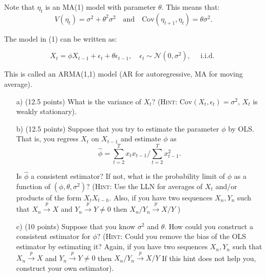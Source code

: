 \documentclass[12] {article}
\begin{document}
\noindent Note that $\eta_t$ is an MA(1) model with parameter $\theta$. This means that:
\[ V(\eta_t) = \sigma^2 + \theta^2 \sigma^2 \quad \textrm{and} \quad \textrm{Cov}(\eta_{t+1}, \eta_t) = \theta \sigma^2.  \]

\noindent The model in (1) can be written as:

\begin{equation}
X_t =  \phi X_{t-1} + \epsilon_t + \theta \epsilon_{t-1}, \quad \epsilon_t \sim \mathcal{N}(0,\sigma^2), \quad \textrm{ i.i.d. }
\end{equation}

\noindent This is called an ARMA(1,1) model (AR for autoregressive, MA for moving average). 

\begin{itemize}

\item [a)] (12.5 points) What is the variance of $X_t$? ({\scshape{Hint}}: $\textrm{Cov}(X_t,\epsilon_t) = \sigma^2$, $X_t$ is weakly stationary).     \\

\item [b)] (12.5 points) Suppose that you try to estimate the parameter $\phi$ by OLS. That is, you regress $X_t$ on $X_{t-1}$ and estimate $\phi$ as
\[ \widehat{\phi} =  \sum_{t=2}^{T} x_t x_{t-1} \Big / \sum_{t=2}^{T} x_{t-1}^2.  \]


Is $\widehat{\phi}$ a consistent estimator? If not, what is the probability limit of $\phi$ as a function of $(\phi, \theta, \sigma^2)$? ({\scshape{Hint:}} Use the LLN for averages of $X_t$ and/or products of the form $X_{t} X_{t-h}$. Also, if you have two sequences $X_n, Y_n$ such that $X_n \overset{p}{\rightarrow} X$ and $Y_n \overset{p}{\rightarrow} Y \neq 0$ then $X_n / Y_n \overset{p}{\rightarrow} X/Y$ )\\

\item [c)] (10 points) Suppose that you know $\sigma^2$ and $\theta$. How could you construct a consistent estimator for $\phi$? ({\scshape{Hint:}} Could you remove the bias of the OLS estimator by estimating it? Again, if you have two sequences $X_n, Y_n$ such that $X_n \overset{p}{\rightarrow} X$ and $Y_n \overset{p}{\rightarrow} Y \neq 0$ then $X_n / Y_n \overset{p}{\rightarrow} X/Y$ If this hint does not help you, construct your own estimator). \\

\end{itemize}
\end{document}
